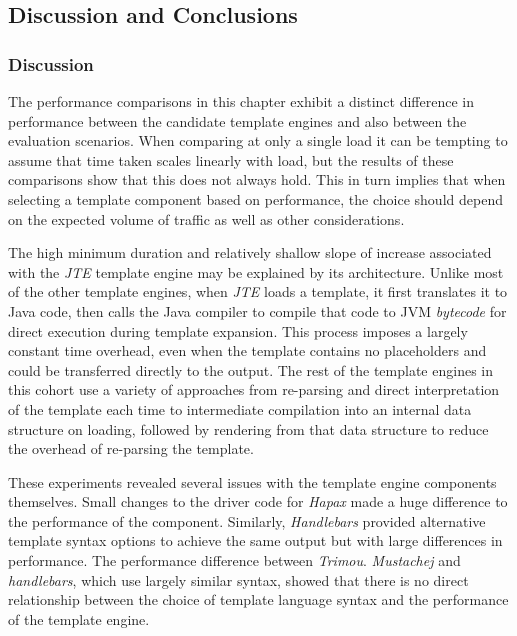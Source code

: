 \subsection{Discussion and Conclusions}
\label{comp:fs2:d and c}

\subsubsection{Discussion}
\label{comp:fs2:dicsussion}

The performance comparisons in this chapter exhibit a distinct difference in performance between the candidate template engines and also between the evaluation scenarios. When comparing at only a single load it can be tempting to assume that time taken scales linearly with load, but the results of these comparisons show that this does not always hold. This in turn implies that when selecting a template component based on performance, the choice should depend on the expected volume of traffic as well as other considerations.

The high minimum duration and relatively shallow slope of increase associated with the \emph{JTE} template engine may be explained by its architecture. Unlike most of the other template engines, when \emph{JTE} loads a template, it first translates it to Java code, then calls the Java compiler to compile that code to JVM \emph{bytecode} for direct execution during template expansion. This process imposes a largely constant time overhead, even when the template contains no placeholders and could be transferred directly to the output. The rest of the template engines in this cohort use a variety of approaches from re-parsing and direct interpretation of the template each time to intermediate compilation into an internal data structure on loading, followed by rendering from that data structure to reduce the overhead of re-parsing the template.

These experiments revealed several issues with the template engine components themselves. Small changes to the driver code for \emph{Hapax} made a huge difference to the performance of the component. Similarly, \emph{Handlebars} provided alternative template syntax options to achieve the same output but with large differences in performance. The performance difference between \emph{Trimou}. \emph{Mustachej} and \emph{handlebars}, which use largely similar syntax, showed that there is no direct relationship between the choice of template language syntax and the performance of the template engine.


